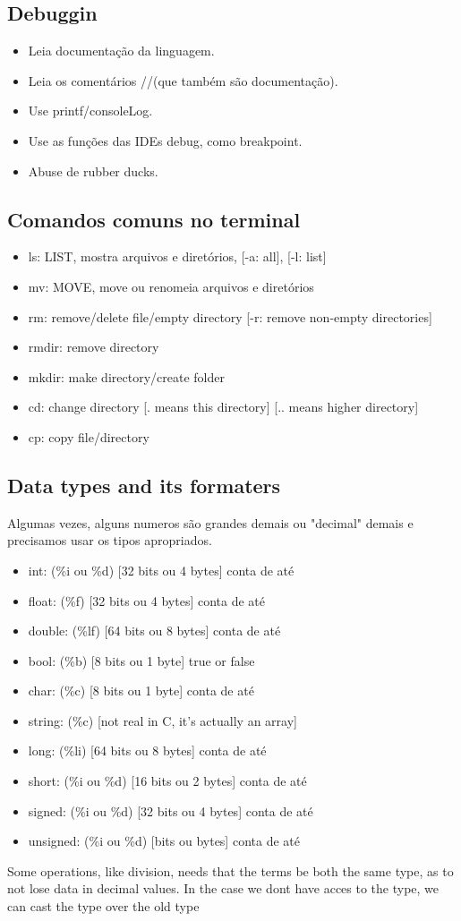 \documentclass[12pt,a4paper]{article} %
\begin{document}
\subsection{Debuggin}
\begin{itemize}
\item Leia documentação da linguagem.
\item Leia os comentários //(que também são documentação).
\item Use printf/consoleLog.
\item Use as funções das IDEs debug, como breakpoint.
\item Abuse de rubber ducks.
\end{itemize}

\subsection{Comandos comuns no terminal}
\begin{itemize}
\item ls: LIST, mostra arquivos e diretórios, [-a: all], [-l: list]
\item mv: MOVE, move ou renomeia arquivos e diretórios
\item rm: remove/delete file/empty directory [-r: remove non-empty directories]
\item rmdir: remove directory
\item mkdir: make directory/create folder
\item cd: change directory [. means this directory] [.. means higher directory]
\item cp: copy file/directory
\end{itemize}

\subsection{Data types and its formaters}
Algumas vezes, alguns numeros são grandes demais ou "decimal" demais e precisamos usar os tipos apropriados.
\begin{itemize}
\item int: (\%i ou \%d) [32 bits ou 4 bytes] conta de até
\item float: (\%f) [32 bits ou 4 bytes] conta de até 
\item double: (\%lf) [64 bits ou 8 bytes] conta de até
\item bool: (\%b) [8 bits ou 1 byte] true or false
\item char:  (\%c) [8 bits ou 1 byte] conta de até
\item string: (\%c) [not real in C, it's actually an array]
\item long: (\%li) [64 bits ou 8 bytes] conta de até
\item short: (\%i ou \%d) [16 bits ou 2 bytes] conta de até
\item signed: (\%i ou \%d) [32 bits ou 4 bytes] conta de até
\item unsigned: (\%i ou \%d) [bits ou bytes] conta de até
\end{itemize}
Some operations, like division, needs that the terms be both the same type, as to not lose data in decimal values. In the case we dont have acces to the type, we can cast the type over the old type
\end{document}
